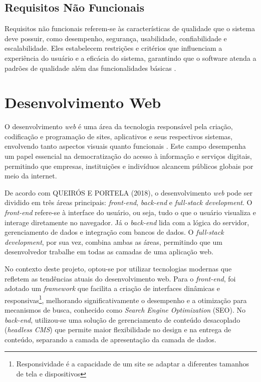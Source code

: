 {    \subsection{Requisitos Não Funcionais}
    Requisitos não funcionais referem-se às características de qualidade que o sistema deve possuir, como desempenho, segurança, usabilidade, confiabilidade e escalabilidade. Eles estabelecem restrições e critérios que influenciam a experiência do usuário e a eficácia do sistema, garantindo que o software atenda a padrões de qualidade além das funcionalidades básicas \citep{pressman2021engenharia}.
    
    \section{Desenvolvimento Web}
    
    O desenvolvimento \textit{web} é uma área da tecnologia responsável pela criação, codificação e programação de sites, aplicativos e seus respectivos sistemas, envolvendo tanto aspectos visuais quanto funcionais \citep{queirosintrodução}. Este campo desempenha um papel essencial na democratização do acesso à informação e serviços digitais, permitindo que empresas, instituições e indivíduos alcancem públicos globais por meio da internet.
    
    De acordo com QUEIRÓS E PORTELA (2018), o desenvolvimento \textit{web} pode ser dividido em três áreas principais: \textit{front-end}, \textit{back-end} e \textit{full-stack development}. O \textit{front-end} refere-se à interface do usuário, ou seja, tudo o que o usuário visualiza e interage diretamente no navegador. Já o \textit{back-end} lida com a lógica do servidor, gerenciamento de dados e integração com bancos de dados. O \textit{full-stack development}, por sua vez, combina ambas as áreas, permitindo que um desenvolvedor trabalhe em todas as camadas de uma aplicação web.
    
    No contexto deste projeto, optou-se por utilizar tecnologias modernas que refletem as tendências atuais do desenvolvimento web. Para o \textit{front-end}, foi adotado um \textit{framework} que facilita a criação de interfaces dinâmicas e responsivas\footnote{Responsividade é a capacidade de um site se adaptar a diferentes tamanhos de tela e dispositivos}, melhorando significativamente o desempenho e a otimização para mecanismos de busca, conhecido como \textit{Search Engine Optimization} (SEO). No \textit{back-end}, utilizou-se uma solução de gerenciamento de conteúdo desacoplado (\textit{headless CMS}) que permite maior flexibilidade no design e na entrega de conteúdo, separando a camada de apresentação da camada de dados.
    
}
